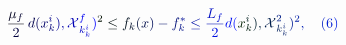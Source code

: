 \documentclass[12pt]{article}
\begin{document}
\makeatletter
\renewcommand*{\@textcolor}[3]{%
  \protect\leavevmode
  \begingroup
    \color#1{#2}#3%
  \endgroup
}
\makeatother
\begin{displaymath}
\mathcolor[RGB]{0,0,15}{\frac { \mathcolor[RGB]{0,0,30}{\mu} _ { \mathcolor[RGB]{0,0,45}{f} } } { \mathcolor[RGB]{0,0,60}{2} } } \, \mathcolor[RGB]{0,0,75}{d} \mathcolor[RGB]{0,0,90}{(} \mathcolor[RGB]{0,0,105}{x} _ { \mathcolor[RGB]{0,0,120}{k} } ^ { \mathcolor[RGB]{0,0,135}{i} } \mathcolor[RGB]{0,0,150}{)} \mathcolor[RGB]{0,0,165}{,} \mathcal { \mathcolor[RGB]{0,0,180}{X} } _ { \mathcolor[RGB]{0,0,195}{k} _ { \mathcolor[RGB]{0,0,210}{k} } ^ { \mathcolor[RGB]{0,0,225}{i} } } ^ { \mathcolor[RGB]{0,0,240}{f} } \mathcolor[RGB]{0,0,255}{)} ^ { \mathcolor[RGB]{0,15,0}{2} } \mathcolor[RGB]{0,15,15}{\leq} \mathcolor[RGB]{0,15,30}{f} _ { \mathcolor[RGB]{0,15,45}{k} } \mathcolor[RGB]{0,15,60}{(} \mathcolor[RGB]{0,15,75}{x} \mathcolor[RGB]{0,15,90}{)} \mathcolor[RGB]{0,15,105}{-} \mathcolor[RGB]{0,15,120}{f} _ { \mathcolor[RGB]{0,15,135}{k} } ^ { \mathcolor[RGB]{0,15,150}{*} } \mathcolor[RGB]{0,15,165}{\leq} \mathcolor[RGB]{0,15,180}{\frac { \mathcolor[RGB]{0,15,195}{L} _ { \mathcolor[RGB]{0,15,210}{f} } } { \mathcolor[RGB]{0,15,225}{2} } } \mathcolor[RGB]{0,15,240}{d} \mathcolor[RGB]{0,15,255}{(} \mathcolor[RGB]{0,30,0}{x} _ { \mathcolor[RGB]{0,30,15}{k} } ^ { \mathcolor[RGB]{0,30,30}{i} } \mathcolor[RGB]{0,30,45}{)} \mathcolor[RGB]{0,30,60}{,} \mathcal { \mathcolor[RGB]{0,30,75}{X} } _ { \mathcolor[RGB]{0,30,90}{k} _ { \mathcolor[RGB]{0,30,105}{k} } ^ { \mathcolor[RGB]{0,30,120}{i} } } ^ { \mathcolor[RGB]{0,30,135}{2} } \mathcolor[RGB]{0,30,150}{)} ^ { \mathcolor[RGB]{0,30,165}{2} } \mathcolor[RGB]{0,30,180}{,} \quad \mathcolor[RGB]{0,30,195}{(} \mathcolor[RGB]{0,30,210}{6} \mathcolor[RGB]{0,30,225}{)}
\end{displaymath}
\end{document}
